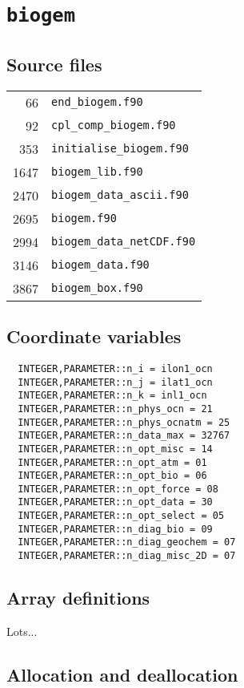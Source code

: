 \documentclass[a4paper,10pt,article]{memoir}
\begin{document}
\chapter{\texttt{biogem}}

\section{Source files}

\begin{tabular}{rl}
  66 & \texttt{end\_biogem.f90} \\
  92 & \texttt{cpl\_comp\_biogem.f90} \\
 353 & \texttt{initialise\_biogem.f90} \\
1647 & \texttt{biogem\_lib.f90} \\
2470 & \texttt{biogem\_data\_ascii.f90} \\
2695 & \texttt{biogem.f90} \\
2994 & \texttt{biogem\_data\_netCDF.f90} \\
3146 & \texttt{biogem\_data.f90} \\
3867 & \texttt{biogem\_box.f90} \\
\end{tabular}

\section{Coordinate variables}

\begin{verbatim}
  INTEGER,PARAMETER::n_i = ilon1_ocn
  INTEGER,PARAMETER::n_j = ilat1_ocn
  INTEGER,PARAMETER::n_k = inl1_ocn
  INTEGER,PARAMETER::n_phys_ocn = 21
  INTEGER,PARAMETER::n_phys_ocnatm = 25
  INTEGER,PARAMETER::n_data_max = 32767
  INTEGER,PARAMETER::n_opt_misc = 14
  INTEGER,PARAMETER::n_opt_atm = 01
  INTEGER,PARAMETER::n_opt_bio = 06
  INTEGER,PARAMETER::n_opt_force = 08
  INTEGER,PARAMETER::n_opt_data = 30
  INTEGER,PARAMETER::n_opt_select = 05
  INTEGER,PARAMETER::n_diag_bio = 09
  INTEGER,PARAMETER::n_diag_geochem = 07
  INTEGER,PARAMETER::n_diag_misc_2D = 07
\end{verbatim}

\section{Array definitions}

Lots...

\section{Allocation and deallocation}
\end{document}
